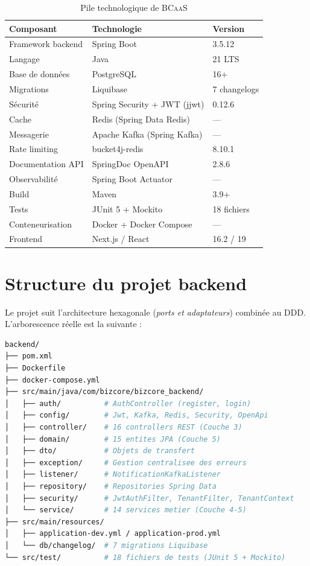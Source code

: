 \documentclass[12pt,a4paper]{report}
\theoremstyle{definition}
\theoremstyle{remark}
\newcommand{\bcaas}{\textsc{BCaaS}}
\newcommand{\api}{\textsc{API}}
\newcommand{\ddd}{\textsc{DDD}}
\begin{document}
\begin{table}[h]
	\centering
	\caption{Pile technologique de \bcaas}
	\label{tab:stack}
	\begin{tabularx}{\textwidth}{lll}
		\toprule
		\textbf{Composant} & \textbf{Technologie} & \textbf{Version} \\
		\midrule
		Framework backend & Spring Boot & 3.5.12 \\
		Langage & Java & 21 LTS \\
		Base de données & PostgreSQL & 16+ \\
		Migrations & Liquibase & 7 changelogs \\
		Sécurité & Spring Security + JWT (jjwt) & 0.12.6 \\
		Cache & Redis (Spring Data Redis) & — \\
		Messagerie & Apache Kafka (Spring Kafka) & — \\
		Rate limiting & bucket4j-redis & 8.10.1 \\
		Documentation \api & SpringDoc OpenAPI & 2.8.6 \\
		Observabilité & Spring Boot Actuator & — \\
		Build & Maven & 3.9+ \\
		Tests & JUnit 5 + Mockito & 18 fichiers \\
		Conteneurisation & Docker + Docker Compose & — \\
		Frontend & Next.js / React & 16.2 / 19 \\
		\bottomrule
	\end{tabularx}
\end{table}

\section{Structure du projet backend}

Le projet suit l'architecture hexagonale (\textit{ports et adaptateurs}) combinée au \ddd{}. L'arborescence réelle est la suivante :

\begin{lstlisting}[language=bash, caption=Structure du projet backend BCaaS]
backend/
├── pom.xml
├── Dockerfile
├── docker-compose.yml
├── src/main/java/com/bizcore/bizcore_backend/
│   ├── auth/          # AuthController (register, login)
│   ├── config/        # Jwt, Kafka, Redis, Security, OpenApi
│   ├── controller/    # 16 controllers REST (Couche 3)
│   ├── domain/        # 15 entites JPA (Couche 5)
│   ├── dto/           # Objets de transfert
│   ├── exception/     # Gestion centralisee des erreurs
│   ├── listener/      # NotificationKafkaListener
│   ├── repository/    # Repositories Spring Data
│   ├── security/      # JwtAuthFilter, TenantFilter, TenantContext
│   └── service/       # 14 services metier (Couche 4-5)
├── src/main/resources/
│   ├── application-dev.yml / application-prod.yml
│   └── db/changelog/  # 7 migrations Liquibase
└── src/test/          # 18 fichiers de tests (JUnit 5 + Mockito)
\end{lstlisting}
\end{document}
